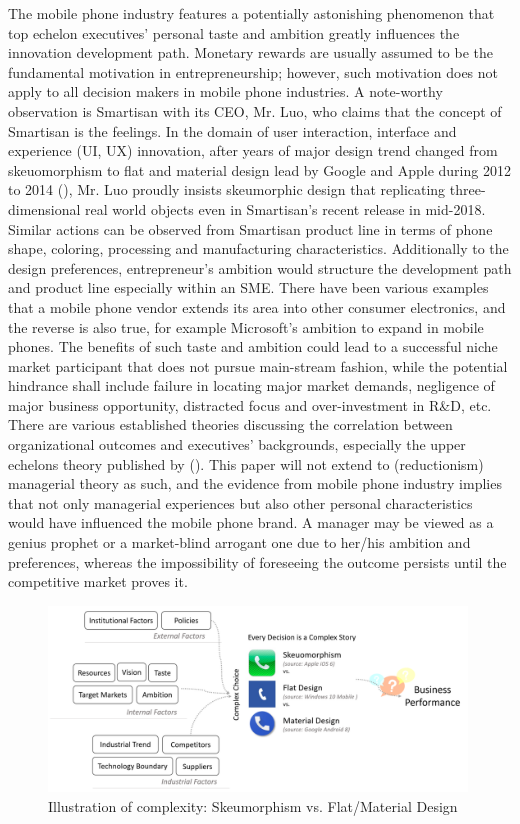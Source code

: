 \documentclass[utf8,english]{gradu3}
\begin{document}
The mobile phone industry features a potentially astonishing phenomenon that top echelon executives' personal taste and ambition greatly influences the innovation development path. Monetary rewards are usually assumed to be the fundamental motivation in entrepreneurship; however, such motivation does not apply to all decision makers in mobile phone industries. A note-worthy observation is Smartisan with its CEO, Mr. Luo, who claims that the concept of Smartisan is the feelings. In the domain of user interaction, interface and experience (UI, UX) innovation, after years of major design trend changed from skeuomorphism to flat and material design lead by Google and Apple during 2012 to 2014 (\cite{burmistrov2015flat}), Mr. Luo proudly insists skeumorphic design that replicating three-dimensional real world objects even in Smartisan's recent release in mid-2018. Similar actions can be observed from Smartisan product line in terms of phone shape, coloring, processing and manufacturing characteristics. Additionally to the design preferences, entrepreneur's ambition would structure the development path and product line especially within an SME. There have been various examples that a mobile phone vendor extends its area into other consumer electronics, and the reverse is also true, for example Microsoft's ambition to expand in mobile phones. The benefits of such taste and ambition could lead to a successful niche market participant that does not pursue main-stream fashion, while the potential hindrance shall include failure in locating major market demands, negligence of major business opportunity, distracted focus and over-investment in R\&D, etc. There are various established theories discussing the correlation between organizational outcomes and executives' backgrounds, especially the upper echelons theory published by \citeauthor{hambrick1984upper} (\citeyear{hambrick1984upper}). This paper will not extend to (reductionism) managerial theory as such, and the evidence from mobile phone industry implies that not only managerial experiences but also other personal characteristics would have influenced the mobile phone brand. A manager may be viewed as a genius prophet or a market-blind arrogant one due to her/his ambition and preferences, whereas the impossibility of foreseeing the outcome persists until the competitive market proves it.

\begin{figure}[htb]
    \centering
    \includegraphics[width=0.99\textwidth]{design.png}
    \caption{Illustration of complexity: Skeumorphism vs. Flat/Material Design}
    \label{fig:design}
\end{figure}
\end{document}
